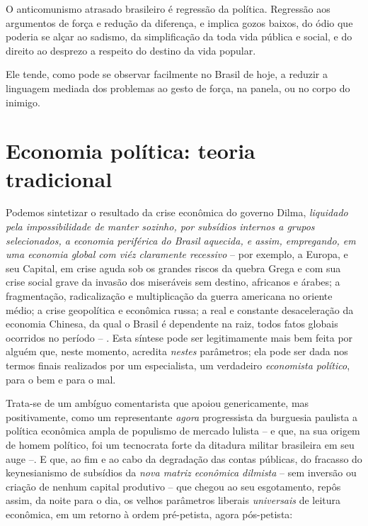 O anticomunismo atrasado brasileiro é regressão da política. Regressão
aos argumentos de força e redução da diferença, e implica gozos baixos,
do ódio que poderia se alçar ao sadismo, da simplificação da toda vida
pública e social, e do direito ao desprezo a respeito do destino da vida
popular.

Ele tende, como pode se observar facilmente no Brasil de hoje, a reduzir
a linguagem mediada dos problemas ao gesto de força, na panela, ou no
corpo do inimigo.

\chapter{Economia política: teoria
tradicional}\label{economia-poluxedtica-teoria-tradicional}

Podemos sintetizar o resultado da crise econômica do governo Dilma,
\emph{liquidado pela impossibilidade de manter sozinho, por subsídios
internos a grupos selecionados, a economia periférica do Brasil
aquecida, e assim, empregando, em uma economia global com viéz
claramente recessivo} -- por exemplo, a Europa, e seu Capital, em crise
aguda sob os grandes riscos da quebra Grega e com sua crise social grave
da invasão dos miseráveis sem destino, africanos e árabes; a
fragmentação, radicalização e multiplicação da guerra americana no
oriente médio; a crise geopolítica e econômica russa; a real e constante
desaceleração da economia Chinesa, da qual o Brasil é dependente na
raiz, todos fatos globais ocorridos no período -- . Esta síntese pode
ser legitimamente mais bem feita por alguém que, neste momento, acredita
\emph{nestes} parâmetros; ela pode ser dada nos termos finais realizados
por um especialista, um verdadeiro \emph{economista político}, para o
bem e para o mal.

Trata-se de um ambíguo comentarista que apoiou genericamente, mas
positivamente, como um representante \emph{agora} progressista da
burguesia paulista a política econômica ampla de populismo de mercado
lulista -- e que, na sua origem de homem político, foi um tecnocrata
forte da ditadura militar brasileira em seu auge --. E que, ao fim e ao
cabo da degradação das contas públicas, do fracasso do keynesianismo de
subsídios da \emph{nova matriz econômica dilmista} -- sem inversão ou
criação de nenhum capital produtivo -- que chegou ao seu esgotamento,
repôs assim, da noite para o dia, os velhos parâmetros liberais
\emph{universais} de leitura econômica, em um retorno à ordem
pré-petista, agora pós-petista:

